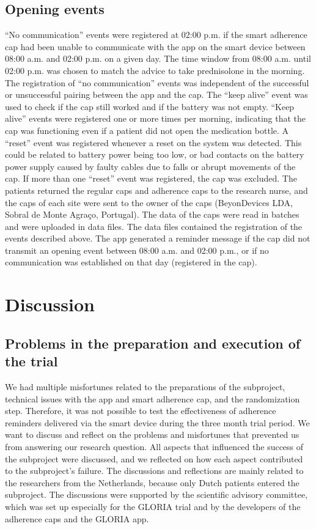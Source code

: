 \documentclass[twocolumn, serif, empirical, authordate]{jote-article}
\begin{document}
\subsection*{Opening events}

 ``No communication'' events were registered at 02:00 p.m. if the smart adherence cap had been unable to communicate with the app on the smart device between 08:00 a.m. and 02:00 p.m. on a given day. The time window from 08:00 a.m. until 02:00 p.m. was chosen to match the advice to take prednisolone in the morning. The registration of ``no communication'' events was independent of the successful or unsuccessful pairing between the app and the cap. The ``keep alive'' event was used to check if the cap still worked and if the battery was not empty. ``Keep alive'' events were registered one or more times per morning, indicating that the cap was functioning even if a patient did not open the medication bottle. A ``reset'' event was registered whenever a reset on the system was detected. This could be related to battery power being too low, or bad contacts on the battery power supply caused by faulty cables due to falls or abrupt movements of the cap. If more than one ``reset'' event was registered, the cap was excluded.
 The patients returned the regular caps and adherence caps to the research nurse, and the caps of each site were sent to the owner of the caps (BeyonDevices LDA, Sobral de Monte Agra\c{c}o, Portugal). The data of the caps were read in batches and were uploaded in data files. The data files contained the registration of the events described above. The app generated a reminder message if the cap did not transmit an opening event between 08:00 a.m. and 02:00 p.m., or if no communication was established on that day (registered in the cap).


\section*{Discussion}



\subsection*{Problems in the preparation and execution of the trial}

 We had multiple misfortunes related to the preparations of the subproject, technical issues with the app and smart adherence cap, and the randomization step. Therefore, it was not possible to test the effectiveness of adherence reminders delivered via the smart device during the three month trial period.
 We want to discuss and reflect on the problems and misfortunes that prevented us from answering our research question. All aspects that influenced the success of the subproject were discussed, and we reflected on how each aspect contributed to the subproject's failure.
 The discussions and reflections are mainly related to the researchers from the Netherlands, because only Dutch patients entered the subproject. The discussions were supported by the scientific advisory committee, which was set up especially for the GLORIA trial and by the developers of the adherence caps and the GLORIA app.
\end{document}

